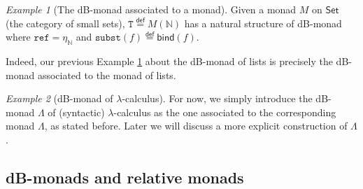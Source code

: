 \documentclass[a4paper,twoside,12pt]{article}
\theoremstyle{definition}
\theoremstyle{remark}
\theoremstyle{example}
\newtheorem{example}{Example}
\newcommand{\NN}{\mathbb{N}}
\newcommand{\TT}{\mathtt{T}}
\newcommand{\subst}{\mathtt{subst}}
\newcommand{\refe}{\mathtt{ref}}
\begin{document}
\begin{example}[The dB-monad associated to a monad]
  \label{ex:list-db-monad}
  Given a monad $M$ on $\mathsf{Set}$ (the category of small sets),
  $\TT \stackrel{\mathsf{def}}{=} M(\NN)$ has a natural structure of
  dB-monad where $\refe = \eta_\NN$ and
  $\subst(f) \stackrel{\mathsf{def}}{=} \mathsf{bind}(f)$.
\end{example}

Indeed, our previous Example \ref{ex:list-db-monad} about the dB-monad
of lists is precisely the dB-monad associated to the monad of lists.







\begin{example}[dB-monad of $\lambda$-calculus]
  For now, we simply introduce the dB-monad $\mathsf{\Lambda}$ of
  (syntactic) $\lambda$-calculus as the one associated to the
  corresponding monad $\Lambda$, as stated before.  Later we will
  discuss a more explicit construction of $\mathtt{\Lambda}$.
\end{example}

\subsection{dB-monads and relative monads}
\label{sec:subst-rel-monads}
\end{document}
